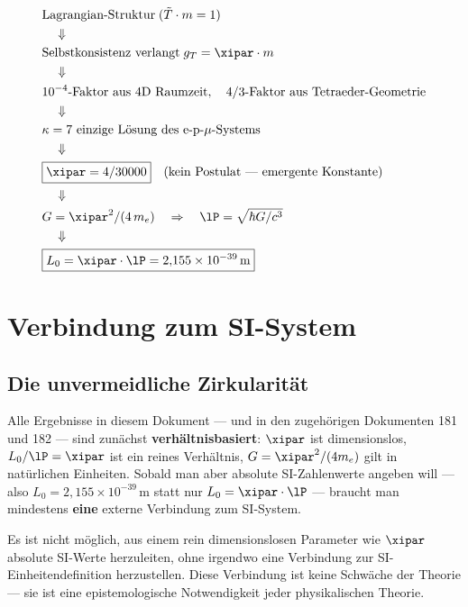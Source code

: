 \begin{keyresult}
\begin{align}
	&\text{Lagrangian-Struktur} \; (\tilde{T} \cdot m = 1) \notag \\
	&\quad\Downarrow \notag \\
	&\text{Selbstkonsistenz verlangt} \; g_T = \xipar \cdot m \notag \\
	&\quad\Downarrow \notag \\
	&10^{-4}\text{-Faktor aus 4D Raumzeit},\quad 4/3\text{-Faktor aus Tetraeder-Geometrie} \notag \\
	&\quad\Downarrow \notag \\
	&\kappa = 7 \text{ einzige Lösung des e-p-}\mu\text{-Systems} \notag \\
	&\quad\Downarrow \notag \\
	&\boxed{\xipar = 4/30000} \quad \text{(kein Postulat — emergente Konstante)} \notag \\
	&\quad\Downarrow \notag \\
	&G = \xipar^2 / (4\, m_e) \quad\Rightarrow\quad \lP = \sqrt{\hbar G/c^3} \notag \\
	&\quad\Downarrow \notag \\
	&\boxed{L_0 = \xipar \cdot \lP = 2{,}155 \times 10^{-39}\,\text{m}}
\end{align}
\end{keyresult}

\section{Verbindung zum SI-System}

\subsection{Die unvermeidliche Zirkularität}

Alle Ergebnisse in diesem Dokument — und in den zugehörigen Dokumenten 181 und 182 — sind zunächst \textbf{verhältnisbasiert}: $\xipar$ ist dimensionslos, $L_0/\lP = \xipar$ ist ein reines Verhältnis, $G = \xipar^2/(4m_e)$ gilt in natürlichen Einheiten. Sobald man aber absolute SI-Zahlenwerte angeben will — also $L_0 = 2{,}155 \times 10^{-39}\,\text{m}$ statt nur $L_0 = \xipar \cdot \lP$ — braucht man mindestens \textbf{eine} externe Verbindung zum SI-System.

\begin{important}
Es ist nicht möglich, aus einem rein dimensionslosen Parameter wie $\xipar$ absolute SI-Werte herzuleiten, ohne irgendwo eine Verbindung zur SI-Einheitendefinition herzustellen. Diese Verbindung ist keine Schwäche der Theorie — sie ist eine epistemologische Notwendigkeit jeder physikalischen Theorie.
\end{important}

